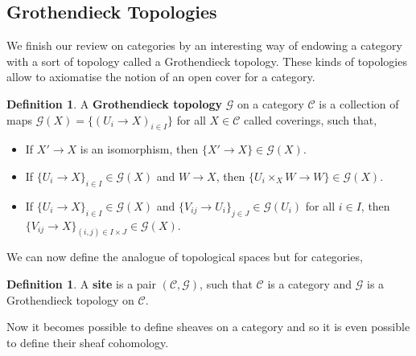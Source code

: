 \documentclass{article}
\theoremstyle{plain}
\theoremstyle{definition}
\newtheorem{definition}[theorem]{Definition}
\begin{document}
\subsection{Grothendieck Topologies}
\label{Groth_topo}
We finish our review on categories by an interesting way of endowing a category with a sort of topology called a Grothendieck topology.
These kinds of topologies allow to axiomatise the notion of an open cover for a category.


\begin{definition}
    A \textbf{Grothendieck topology} $\mathcal{G}$ on a category $\mathcal{C}$ is a collection of maps $\mathcal{G}(X) = \{(U_i\rightarrow X)_{i\in I}\}$ for all $X\in \mathcal{C}$ called coverings, such that,
    \begin{itemize}
        \item If $X'\rightarrow X$ is an isomorphism, then $\{X'\rightarrow X\}\in \mathcal{G}(X)$.
        \item If $\{U_i\rightarrow X\}_{i\in I} \in \mathcal{G}(X)$ and $W\rightarrow X$, then $\{U_i\times_XW \rightarrow W\} \in \mathcal{G}(X)$.
        \item If $\{U_i \rightarrow X\}_{i\in I}\in\mathcal{G}(X)$ and $\{V_{ij} \rightarrow U_i\}_{j\in J}\in \mathcal{G}(U_i)$ for all $i\in I$, then $\{V_{ij} \rightarrow X\}_{(i,j)\in I\times J}\in \mathcal{G}(X)$.
    \end{itemize}
\end{definition}

\noindent We can now define the analogue of topological spaces but for categories,

\begin{definition}
    A \textbf{site} is a pair $(\mathcal{C},\mathcal{G})$, such that $\mathcal{C}$ is a category and $\mathcal{G}$ is a Grothendieck topology on $\mathcal{C}$.
\end{definition}

\noindent Now it becomes possible to define sheaves on a category and so it is even possible to define their sheaf cohomology.
\end{document}
